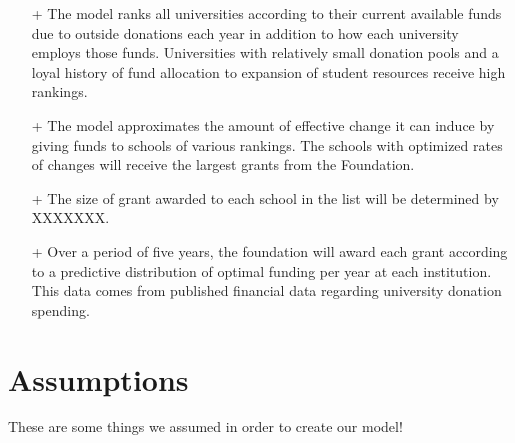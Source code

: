 \documentclass[paper.tex]{subfiles}
\begin{document}
	
	
	 
	\begin{itemize} 
		\item[+] The model ranks all universities according to their current available funds due to outside donations each year in addition to how each university employs those funds. Universities with relatively small donation pools and a loyal history of fund allocation to expansion of student resources receive high rankings.
		\item[+] The model approximates the amount of effective change it can induce by giving funds to schools of various rankings. The schools with optimized rates of changes will receive the largest grants from the Foundation.
		\item[+] The size of grant awarded to each school in the list will be determined by XXXXXXX.
		\item[+] Over a period of five years, the foundation will award each grant according to a predictive distribution of optimal funding per year at each institution. This data comes from published financial data regarding university donation spending.
	\end{itemize}
	
	
	\section{Assumptions}
	These are some things we assumed in order to create our model!
\end{document}
